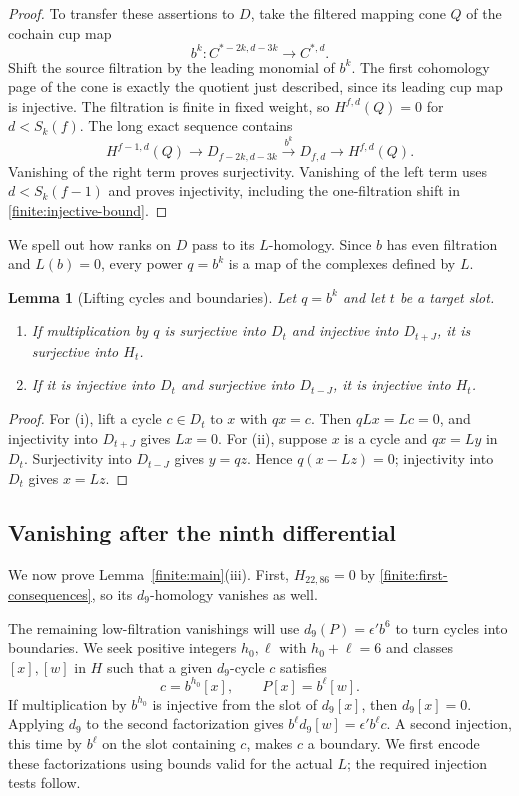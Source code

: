 \documentclass[11pt]{article}
\newtheorem{lemma}[theorem]{Lemma}
\theoremstyle{definition}
\theoremstyle{remark}
\numberwithin{equation}{section}
\begin{document}
\begin{proof}
To transfer these assertions to $D$, take the filtered mapping cone
$Q$ of the cochain cup map
\[
 b^k\colon C^{*-2k,d-3k}\longrightarrow C^{*,d}.
\]
Shift the source filtration by the leading monomial of $b^k$.
The first cohomology page of the cone is exactly the quotient just
described, since its leading cup map is injective.  The filtration
is finite in fixed weight, so $H^{f,d}(Q)=0$ for $d<S_k(f)$.
The long exact sequence contains
\[
 H^{f-1,d}(Q)\longrightarrow D_{f-2k,d-3k}
 \xrightarrow{\ b^k\ }D_{f,d}\longrightarrow H^{f,d}(Q).
\]
Vanishing of the right term proves surjectivity.  Vanishing of the
left term uses $d<S_k(f-1)$ and proves injectivity, including the
one-filtration shift in \eqref{finite:injective-bound}.
\end{proof}

We spell out how ranks on $D$ pass to its $L$-homology.  Since $b$
has even filtration and $L(b)=0$, every power $q=b^k$ is a map of
the complexes defined by $L$.

\begin{lemma}[Lifting cycles and boundaries]\label{finite:homology-transfer}
Let $q=b^k$ and let $t$ be a target slot.
\begin{enumerate}[label=\textup{(\roman*)}]
 \item If multiplication by $q$ is surjective into $D_t$ and
 injective into $D_{t+J}$, it is surjective into $H_t$.
 \item If it is injective into $D_t$ and surjective into
 $D_{t-J}$, it is injective into $H_t$.
\end{enumerate}
\end{lemma}
\begin{proof}
For (i), lift a cycle $c\in D_t$ to $x$ with $qx=c$.
Then $qLx=Lc=0$, and injectivity into $D_{t+J}$ gives $Lx=0$.
For (ii), suppose $x$ is a cycle and $qx=Ly$ in $D_t$.
Surjectivity into $D_{t-J}$ gives $y=qz$.  Hence
$q(x-Lz)=0$; injectivity into $D_t$ gives $x=Lz$.
\end{proof}

\subsection{Vanishing after the ninth differential}

We now prove Lemma~\ref{finite:main}\textup{(iii)}.  First,
$H_{22,86}=0$ by \eqref{finite:first-consequences}, so its
$d_9$-homology vanishes as well.

The remaining low-filtration vanishings will use
$d_9(P)=\epsilon'b^6$ to turn cycles into boundaries.  We seek
positive integers $h_0,\ell$ with $h_0+\ell=6$ and classes $[x],[w]$
in $H$ such that a given $d_9$-cycle $c$ satisfies
\[
 c=b^{h_0}[x],\qquad P[x]=b^\ell[w].
\]
If multiplication by $b^{h_0}$ is injective from the slot of
$d_9[x]$, then $d_9[x]=0$.  Applying $d_9$ to the second
factorization gives $b^\ell d_9[w]=\epsilon'b^\ell c$.
A second injection, this time by $b^\ell$ on the slot containing
$c$, makes $c$ a boundary.  We first encode these factorizations
using bounds valid for the actual $L$; the required injection
tests follow.
\end{document}
